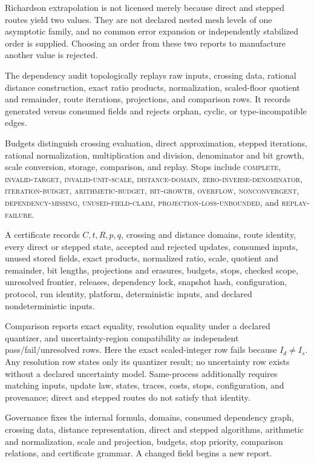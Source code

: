 Richardson extrapolation is not licensed merely because direct and stepped routes yield two values.  They are not
declared nested mesh levels of one asymptotic family, and no common error expansion or independently stabilized order
is supplied.  Choosing an order from these two reports to manufacture another value is rejected.

The dependency audit topologically replays raw inputs, crossing data, rational distance construction, exact ratio
products, normalization, scaled-floor quotient and remainder, route iterations, projections, and comparison rows.
It records generated versus consumed fields and rejects orphan, cyclic, or type-incompatible edges.

Budgets distinguish crossing evaluation, direct approximation, stepped iterations, rational normalization,
multiplication and division, denominator and bit growth, scale conversion, storage, comparison, and replay.  Stops
include \textsc{complete}, \textsc{invalid-target}, \textsc{invalid-unit-scale}, \textsc{distance-domain},
\textsc{zero-inverse-denominator}, \textsc{iteration-budget}, \textsc{arithmetic-budget},
\textsc{bit-growth}, \textsc{overflow}, \textsc{nonconvergent}, \textsc{dependency-missing},
\textsc{unused-field-claim}, \textsc{projection-loss-unbounded}, and \textsc{replay-failure}.

A certificate records \(C,t,R,p,q\), crossing and distance domains, route identity, every direct or stepped state,
accepted and rejected updates, consumed inputs, unused stored fields, exact products, normalized ratio, scale,
quotient and remainder, bit lengths, projections and erasures, budgets, stops, checked scope, unresolved frontier,
releases, dependency lock, snapshot hash, configuration, protocol, run identity, platform, deterministic inputs, and
declared nondeterministic inputs.

Comparison reports exact equality, resolution equality under a declared quantizer, and uncertainty-region
compatibility as independent pass/fail/unresolved rows.  Here the exact scaled-integer row fails because \(I_d\ne I_s\).
Any resolution row states only its quantizer result; no uncertainty row exists without a declared uncertainty model.
Same-process additionally requires matching inputs, update law, states, traces, costs, stops, configuration, and
provenance; direct and stepped routes do not satisfy that identity.

Governance fixes the internal formula, domains, consumed dependency graph, crossing data, distance representation,
direct and stepped algorithms, arithmetic and normalization, scale and projection, budgets, stop priority, comparison
relations, and certificate grammar.  A changed field begins a new report.

